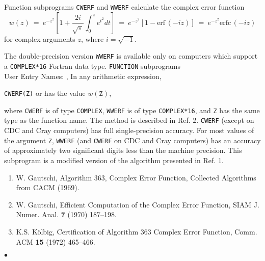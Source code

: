                          
                  
\Submitter{}                             
                       
Function subprograms {\tt CWERF} and {\tt WWERF} calculate
the complex error function
$$ w(z) \ = \ \displaystyle e^{-z^2}\left[1+\frac{2i}{\sqrt\pi}
\int^z_0 e^{t^2} dt\right]
\ = \ \displaystyle e^{-z^2}\left[1-\mathrm{erf}\,(-iz)\right]
\ = \ \displaystyle e^{-z^2}\mathrm{erfc}\,(-iz)$$
for complex arguments $z$, where $i = \sqrt{-1}$.
\par
The double-precision version {\tt WWERF} is available only on computers
which support a {\tt COMPLEX*16} Fortran data type.
\Structure
{\tt FUNCTION} subprograms \\
User Entry Names: , 
\Usage
In any arithmetic expression,
\begin{center}
{\tt CWERF(Z)} \quad or  \quad has the value \quad
$w(\mathtt{Z})$,
\end{center}
where {\tt CWERF} is of type {\tt COMPLEX}, {\tt WWERF} is of type
{\tt COMPLEX*16}, and {\tt Z} has the same type as the function name.
\Method
The method is described in Ref. 2.
\Accuracy
{\tt CWERF} (except on CDC and Cray computers)
has full single-precision accuracy.
For most values of the argument {\tt Z}, {\tt WWERF}
(and {\tt CWERF} on CDC and Cray computers) has an accuracy of
approximately two significant digits less than the machine precision.
\Notes
This subprogram is a modified version of the algorithm
presented in Ref. 1.
\Refer
\begin{enumerate}
\item  W. Gautschi, Algorithm 363, Complex Error Function,
Collected Algorithms from CACM (1969).
\item W. Gautschi, Efficient Computation of the Complex Error Function,
SIAM J. Numer. Anal. {\bf 7} (1970) 187--198.
\item K.S. K\"olbig, Certification of Algorithm 363 Complex
Error Function, Comm. ACM {\bf 15} (1972) 465--466.
\end{enumerate}
$\bullet$
